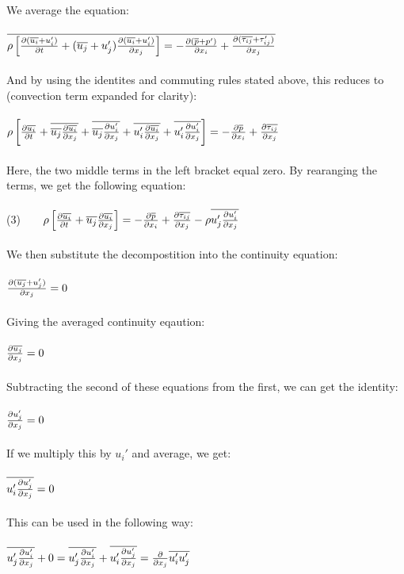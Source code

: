 \documentclass[a4paper,english,11pt,twoside]{article}
\newcommand{\tab}{\hspace*{2em}}
\begin{document}
\\
We average the equation:\\
\\
$\overline{\rho\left[\frac{\partial (\overline{u_i} + u_i')}{\partial t} + (\overline{u_j} + u_j')\frac{\partial (\overline{u_i} + u_i')}{\partial x_j}\right] = -\frac{\partial (\overline{p} + p')}{\partial x_i} + \frac{\partial (\overline{\tau_{ij}} + \tau_{ij}')}{\partial x_j}}$\\
\\
And by using the identites and commuting rules stated above, this reduces to (convection term expanded for clarity):\\
\\
$\rho\left[\frac{\partial \overline{u_i}}{\partial t} + \overline{\overline{u_j}\frac{\partial \overline{u_i}}{\partial x_j}} + \overline{\overline{u_j}\frac{\partial u_i'}{\partial x_j}} + \overline{u_i'\frac{\partial \overline{u_i}}{\partial x_j}} + \overline{u_i'\frac{\partial u_i'}{\partial x_j}}\right] = -\frac{\partial \overline{p}}{\partial x_i}+ \frac{\partial \overline{\tau_{ij}}}{\partial x_j}$\\
\\
Here, the two middle terms in the left bracket equal zero. By rearanging the terms, we get the  following equation:\\
\\
(3)$\tab\rho\left[\pdi{\ol{u_i}}{t} + \ol{u_j}\pdi{\ol{u_i}}{x_j}\right] = -\pdi{\ol{p}}{x_i}+ \pdi{\ol{\tau_{ij}}}{x_j} - \rho\ol{u_j'\pdi{u_i'}{x_j}}$\\
\\
We then substitute the decompostition into the continuity equation:\\
\\
$\frac{\partial (\overline{u_j} + u_j')}{\partial x_j} = 0$\\
\\
Giving the averaged continuity eqaution:\\
\\
$\frac{\partial \overline{u_j}}{\partial x_j} = 0$\\
\\
Subtracting the second of these equations from the first, we can get the identity:\\
\\
$\frac{\partial u_j'}{\partial x_j} = 0$\\
\\
If we multiply this by $u_i'$ and average, we get:\\
\\
$\overline{u_i'\frac{\partial u_j'}{\partial x_j}} = 0$\\
\\
This can be used in the following way:\\
\\
$\overline{u_j'\frac{\partial u_i'}{\partial x_j}} + 0 = \overline{u_j'\frac{\partial u_i'}{\partial x_j}} + \overline{u_i'\frac{\partial u_j'}{\partial x_j}} = \frac{\partial }{\partial x_j}\overline{u_i' u_j'}$\\
\end{document}
